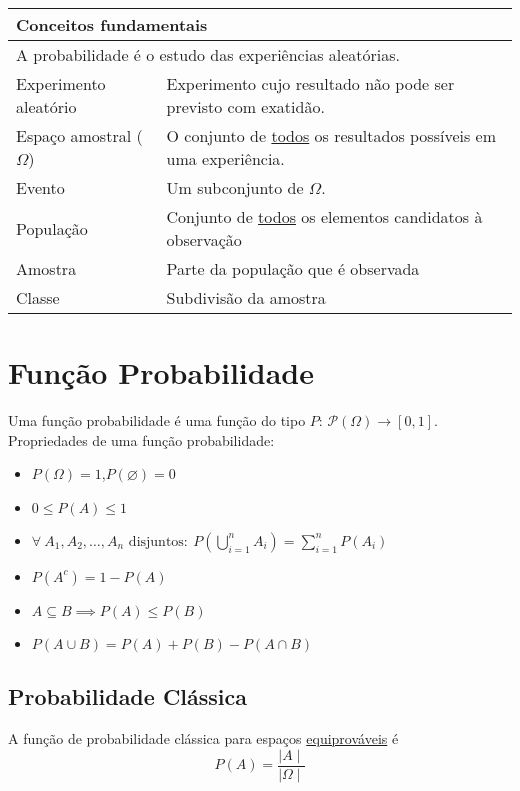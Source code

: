 \documentclass{article}
\begin{document}
\begin{table}[h]
  \begin{tabular}{ll}
    \multicolumn{2}{l}{\hspace{-6pt}\textbf{Conceitos fundamentais}} \\ \midrule
    \multicolumn{2}{l}{A probabilidade é o estudo das experiências aleatórias.} \\[5pt]
    Experimento aleatório & Experimento cujo resultado não pode ser previsto com exatidão. \\[1pt]
    Espaço amostral ($\Omega$) & O conjunto de \uline{todos} os resultados possíveis em uma experiência. \\[1pt]
    Evento & Um subconjunto de $\Omega$. \\[3pt]
    População & Conjunto de \uline{todos} os elementos candidatos à observação \\[1pt]
    Amostra & Parte da população que é observada \\
    Classe & Subdivisão da amostra
  \end{tabular}
\end{table} \vspace{-10pt}



\section{Função Probabilidade}
Uma função probabilidade é uma função do tipo $P:\, \mathcal{P}(\Omega) \to [0, 1]$. \\[5pt]
Propriedades de uma função probabilidade:
\begin{itemize}
  \item $P(\Omega) = 1$,\enspace $P(\varnothing) = 0$
  \item $0 \leq P(A) \leq 1$
  \item $\forall \: A_1, A_2, \hdots, A_n \text{ disjuntos}:\: P\left(\bigcup\limits_{i=1}^{n} A_i\right) = \sum\limits_{i=1}^{n} P(A_i)$
  \item $P(A^c) = 1 - P(A)$
  \item $A \subseteq B \implies P(A) \leq P(B)$
  \item $P(A \cup B) = P(A) + P(B) - P(A \cap B)$
\end{itemize}


\subsection{Probabilidade Clássica}
A função de probabilidade clássica para espaços \uline{equiprováveis} é
\[ P(A) = \frac{\mid A \mid}{\mid \Omega \mid} \]
\end{document}
